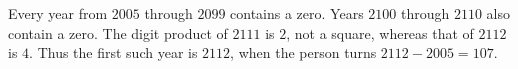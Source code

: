 Every year from $2005$ through $2099$ contains a zero. Years $2100$ through $2110$ also contain a zero. The digit product of $2111$ is $2$, not a square, whereas that of $2112$ is $4$. Thus the first such year is $2112$, when the person turns $2112-2005=\boxed{107}$.
